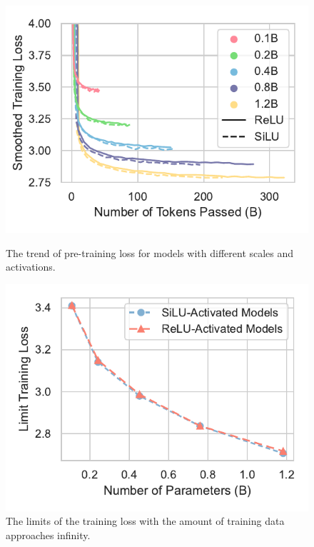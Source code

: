 \documentclass{article} %
\begin{document}
\begin{figure}[ht]
\begin{minipage}[c]{0.50\linewidth}
    \centering
    \includegraphics[width=\linewidth]{figures/pretrain-loss.pdf}
    \caption{The trend of pre-training loss for models with different scales and activations.}
    \label{fig:pre-training-loss}
\end{minipage}
\hfill
\begin{minipage}[c]{0.48\linewidth}
    \centering
    \includegraphics[width=\linewidth]{figures/infite-loss.pdf}
    \caption{The limits of the training loss with the amount of training data approaches infinity.}
    \label{fig:infinite-loss}
\end{minipage}
\end{figure}
\end{document}

